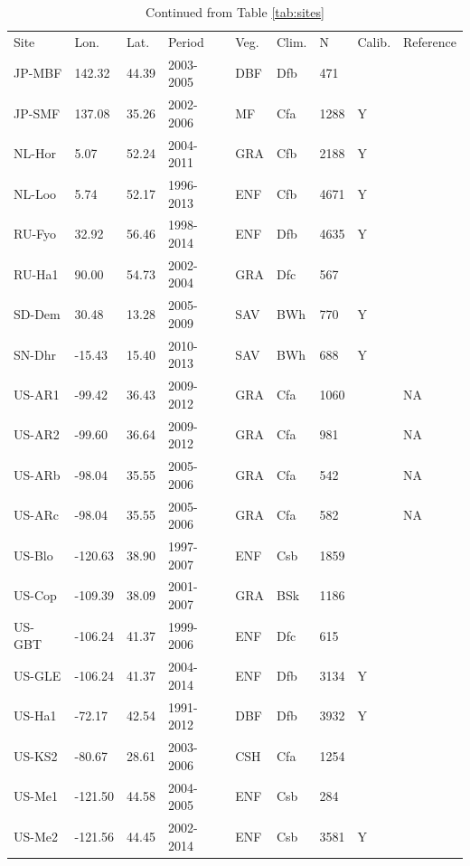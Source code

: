 \documentclass[gmd, manuscript]{copernicus}
\begin{document}
\begin{table}[t]
\caption{Continued from Table \ref{tab:sites}} 
\begin{tabular}{lllllllll}
  \tophline
  Site & Lon. & Lat. & Period & Veg. & Clim. & N & Calib. & Reference \\ 
  \middlehline  
  JP-MBF & 142.32 & 44.39 & 2003-2005 & DBF & Dfb & 471 &  & \citet{JP-XXX} \\ 
  JP-SMF & 137.08 & 35.26 & 2002-2006 & MF & Cfa & 1288 & Y & \citet{JP-XXX} \\ 
  NL-Hor & 5.07 & 52.24 & 2004-2011 & GRA & Cfb & 2188 & Y & \citet{NL-Hor} \\ 
  NL-Loo & 5.74 & 52.17 & 1996-2013 & ENF & Cfb & 4671 & Y & \citet{NL-Loo} \\ 
  RU-Fyo & 32.92 & 56.46 & 1998-2014 & ENF & Dfb & 4635 & Y & \citet{RU-Fyo} \\ 
  RU-Ha1 & 90.00 & 54.73 & 2002-2004 & GRA & Dfc & 567 &  & \citet{RU-Ha1} \\ 
  SD-Dem & 30.48 & 13.28 & 2005-2009 & SAV & BWh & 770 & Y & \citet{SD-Dem} \\ 
  SN-Dhr & -15.43 & 15.40 & 2010-2013 & SAV & BWh & 688 & Y & \citet{SN-Dhr} \\ 
  US-AR1 & -99.42 & 36.43 & 2009-2012 & GRA & Cfa & 1060 &  & NA \\ 
  US-AR2 & -99.60 & 36.64 & 2009-2012 & GRA & Cfa & 981 &  & NA \\ 
  US-ARb & -98.04 & 35.55 & 2005-2006 & GRA & Cfa & 542 &  & NA \\ 
  US-ARc & -98.04 & 35.55 & 2005-2006 & GRA & Cfa & 582 &  & NA \\ 
  US-Blo & -120.63 & 38.90 & 1997-2007 & ENF & Csb & 1859 &  & \citet{US-Blo} \\ 
  US-Cop & -109.39 & 38.09 & 2001-2007 & GRA & BSk & 1186 &  & \citet{US-Cop} \\ 
  US-GBT & -106.24 & 41.37 & 1999-2006 & ENF & Dfc & 615 &  & \citet{US-GBT} \\ 
  US-GLE & -106.24 & 41.37 & 2004-2014 & ENF & Dfb & 3134 & Y & \citet{US-GLE} \\ 
  US-Ha1 & -72.17 & 42.54 & 1991-2012 & DBF & Dfb & 3932 & Y & \citet{US-Ha1} \\ 
  US-KS2 & -80.67 & 28.61 & 2003-2006 & CSH & Cfa & 1254 &  & \citet{US-KS2} \\ 
  US-Me1 & -121.50 & 44.58 & 2004-2005 & ENF & Csb & 284 &  & \citet{US-Me1} \\ 
  US-Me2 & -121.56 & 44.45 & 2002-2014 & ENF & Csb & 3581 & Y & \citet{US-Me2} \\ 

\end{tabular}
\end{table}
\end{document}

